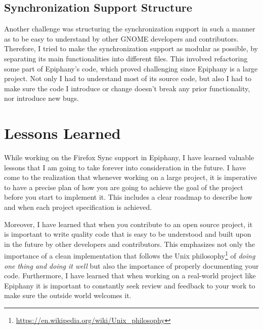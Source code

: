 \subsection{Synchronization Support Structure}
\label{sub-sec:sync-support-structure}

Another challenge was structuring the synchronization support in such a manner as to be easy to understand by other GNOME developers and contributors. Therefore, I tried to make the synchronization support as modular as possible, by separating its main functionalities into different files. This involved refactoring some part of Epiphany's code, which proved challenging since Epiphany is a large project. Not only I had to understand most of its source code, but also I had to make sure the code I introduce or change doesn't break any prior functionality, nor introduce new bugs.

\section{Lessons Learned}
\label{sec:lessons-learned}

While working on the Firefox Sync support in Epiphany, I have learned valuable lessons that I am going to take forever into consideration in the future. I have come to the realization that whenever working on a large project, it is imperative to have a precise plan of how you are going to achieve the goal of the project before you start to implement it. This includes a clear roadmap to describe how and when each project specification is achieved.

Moreover, I have learned that when you contribute to an open source project, it is important to write quality code that is easy to be understood and built upon in the future by other developers and contributors. This emphasizes not only the importance of a clean implementation that follows the Unix philosophy\footnote{\url{https://en.wikipedia.org/wiki/Unix_philosophy}} of \textit{doing one thing and doing it well} but also the importance of properly documenting your code. Furthermore, I have learned that when working on a real-world project like Epiphany it is important to constantly seek review and feedback to your work to make sure the outside world welcomes it.

